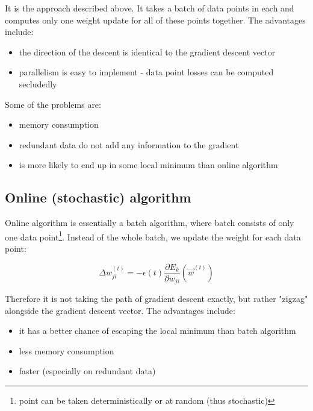 It is the approach described above. It takes a batch of data points in each and computes only one weight update for all of these points together. The advantages include:

\begin{itemize}

\item the direction of the descent is identical to the gradient descent vector
\item parallelism is easy to implement - data point losses can be computed secludedly

\end{itemize}

\noindent
Some of the problems are:

\begin{itemize}

\item memory consumption
\item redundant data do not add any information to the gradient
\item is more likely to end up in some local minimum than online algorithm

\end{itemize}

\subsection*{Online (stochastic) algorithm}

Online algorithm is essentially a batch algorithm, where batch consists of only one data point\footnote{point can be taken deterministically or at random (thus stochastic)}. Instead of the whole batch, we update the weight for each data point:

$$ \Delta w_{ji}^{(t)} = - \epsilon(t) \frac{\partial E_k}{\partial w_{ji}}(\overrightarrow{w}^{(t)}) $$

\noindent
Therefore it is not taking the path of gradient descent exactly, but rather "zigzag" alongside the gradient descent vector. The advantages include:

\begin{itemize}

\item it has a better chance of escaping the local minimum than batch algorithm
\item less memory consumption
\item faster (especially on redundant data)

\end{itemize}

